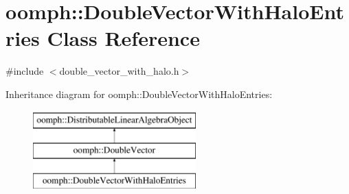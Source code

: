 \hypertarget{classoomph_1_1DoubleVectorWithHaloEntries}{}\section{oomph\+:\+:Double\+Vector\+With\+Halo\+Entries Class Reference}
\label{classoomph_1_1DoubleVectorWithHaloEntries}


{\ttfamily \#include $<$double\+\_\+vector\+\_\+with\+\_\+halo.\+h$>$}

Inheritance diagram for oomph\+:\+:Double\+Vector\+With\+Halo\+Entries\+:\begin{figure}[H]
\begin{center}
\leavevmode
\includegraphics[height=3.000000cm]{classoomph_1_1DoubleVectorWithHaloEntries}
\end{center}
\end{figure}
